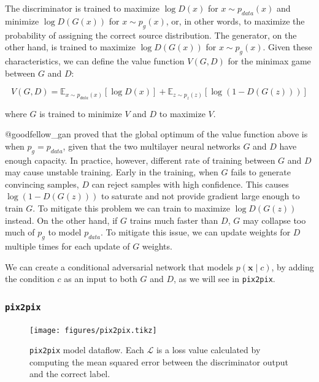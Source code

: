\documentclass[]{article}
\begin{document}
The discriminator is trained to maximize \(\log D(x)\) for
\(x \sim p_{data}(x)\) and minimize \(\log D(G(x))\) for
\(x \sim p_g(x)\), or, in other words, to maximize the probability of
assigning the correct source distribution. The generator, on the other
hand, is trained to maximize \(\log D(G(x))\) for \(x \sim p_g(x)\).
Given these characteristics, we can define the value function
\(V(G, D)\) for the minimax game between \(G\) and \(D\):

\begin{equation}
    V(G, D) = \mathbb{E}_{x \sim p_{data}(x)}[\log D(x)] + \mathbb{E}_{z \sim p_{z}(z)}[\log (1 - D(G(z)))] \label{eq:gan}
\end{equation}

where \(G\) is trained to minimize \(V\) and \(D\) to maximize \(V\).

@goodfellow\_gan proved that the global optimum of the value function
above is when \(p_g = p_{data}\), given that the two multilayer neural
networks \(G\) and \(D\) have enough capacity. In practice, however,
different rate of training between \(G\) and \(D\) may cause unstable
training. Early in the training, when \(G\) fails to generate convincing
samples, \(D\) can reject samples with high confidence. This causes
\(\log (1 - D(G(z)))\) to saturate and not provide gradient large enough
to train \(G\). To mitigate this problem we can train to maximize
\(\log D(G(z))\) instead. On the other hand, if \(G\) trains much faster
than \(D\), \(G\) may collapse too much of \(p_g\) to model
\(p_{data}\). To mitigate this issue, we can update weights for \(D\)
multiple times for each update of \(G\) weights.

We can create a conditional adversarial network that models
\(p(\mathbf{x} \mid c)\), by adding the condition \(c\) as an input to
both \(G\) and \(D\), as we will see in \texttt{pix2pix}.

\hypertarget{pix2pix}{%
\subsubsection{\texorpdfstring{\texttt{pix2pix}}{pix2pix}}\label{pix2pix}}

\begin{figure}[h]
    \texttt{[image: figures/pix2pix.tikz]}
\centering
\caption{\texttt{pix2pix} model dataflow. Each $\mathcal{L}$ is a loss value calculated by computing the mean squared error between the discriminator output and the correct label. \label{fig:pix2pix}}
\end{figure}
\end{document}
